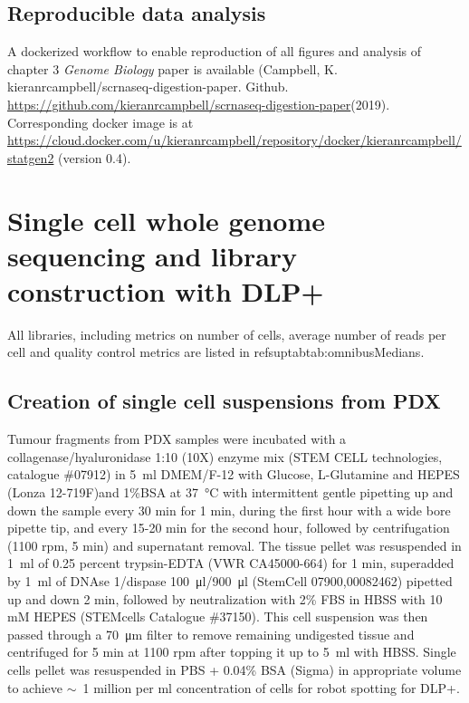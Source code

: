 \subsection{Reproducible data analysis}
A dockerized workflow to enable reproduction of all figures and analysis of chapter 3 \textit{Genome Biology} paper is available (Campbell, K. kieranrcampbell/scrnaseq-digestion-paper. Github. \url{https://github.com/kieranrcampbell/scrnaseq-digestion-paper}(2019). Corresponding docker image is at \url{https://cloud.docker.com/u/kieranrcampbell/repository/docker/kieranrcampbell/statgen2} (version 0.4).

\section{Single cell whole genome sequencing and library construction with DLP+}

All libraries, including metrics on number of cells, average number of reads per cell and quality control metrics are listed in refsuptab{tab:omnibusMedians}.

\subsection{Creation of single cell suspensions from PDX}
Tumour fragments from PDX samples were incubated with a collagenase/hyaluronidase 1:10 (10X) enzyme mix (STEM CELL technologies, catalogue \#07912) in  \SI{5}{\ml} DMEM/F-12 with Glucose, L-Glutamine and HEPES (Lonza 12-719F)and 1\%BSA at \SI{37}{\degreeCelsius} with intermittent gentle pipetting up and down the sample every 30 min for 1 min, during the first hour with a wide bore pipette tip, and every 15-20 min for the second hour, followed by  centrifugation (1100 rpm, 5 min) and supernatant removal.
The tissue pellet was resuspended in \SI{1}{\ml} of  0.25 percent trypsin-EDTA (VWR CA45000-664) for 1 min, superadded by \SI{1}{\ml} of DNAse 1/dispase \SI{100}{\ul}/\SI{900}{\ul} (StemCell 07900,00082462) pipetted up and down 2 min, followed by neutralization with 2\% FBS in HBSS with 10 mM HEPES (STEMcells Catalogue \#37150). 
This cell suspension was then passed through a \SI{70}{\micro\metre} filter to remove remaining undigested tissue and centrifuged for 5 min at 1100 rpm after topping it up to \SI{5}{\ml} with HBSS.
Single cells pellet  was resuspended in PBS + 0.04\% BSA (Sigma) in appropriate volume to achieve  $\sim$~1 million per ml concentration of cells for robot spotting for DLP+.

